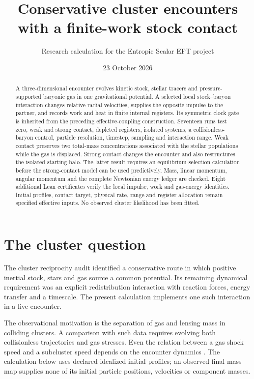 \documentclass[11pt]{article}
\title{Conservative cluster encounters with a finite-work stock contact}
\author{Research calculation for the Entropic Scalar EFT project}
\date{23 October 2026}
\begin{document}
\maketitle
\begin{abstract}
A three-dimensional encounter evolves kinetic stock, stellar tracers and
pressure-supported baryonic gas in one gravitational potential. A selected
local stock--baryon interaction changes relative radial velocities, supplies
the opposite impulse to the partner, and records work and heat in finite
internal registers. Its symmetric clock gate is inherited from the preceding
effective-coupling construction. Seventeen runs test zero, weak and strong
contact, depleted registers, isolated systems, a collisionless-baryon control,
particle resolution, timestep, sampling and interaction range. Weak contact
preserves two total-mass concentrations associated with the stellar populations
while the gas is displaced. Strong contact changes the encounter and also
restructures the isolated starting halo. The latter result requires an
equilibrium-selection calculation before the strong-contact model can be used
predictively. Mass, linear momentum, angular momentum and the complete
Newtonian energy ledger are checked. Eight additional Lean certificates verify
the local impulse, work and gas-energy identities. Initial profiles, contact
target, physical rate, range and register allocation remain specified effective
inputs. No observed cluster likelihood has been fitted.
\end{abstract}

\section{The cluster question}
The cluster reciprocity audit identified a conservative route in which
positive inertial stock, stars and gas source a common potential. Its remaining
dynamical requirement was an explicit redistribution interaction with reaction
forces, energy transfer and a timescale. The present calculation implements
one such interaction in a live encounter.

The observational motivation is the separation of gas and lensing mass in
colliding clusters\cite{Clowe}. A comparison with such data requires evolving
both collisionless trajectories and gas stresses. Even the relation between a
gas shock speed and a subcluster speed depends on the encounter dynamics
\cite{Springel}. The calculation below uses declared idealized initial profiles;
an observed final mass map supplies none of its initial particle positions,
velocities or component masses.
\end{document}

